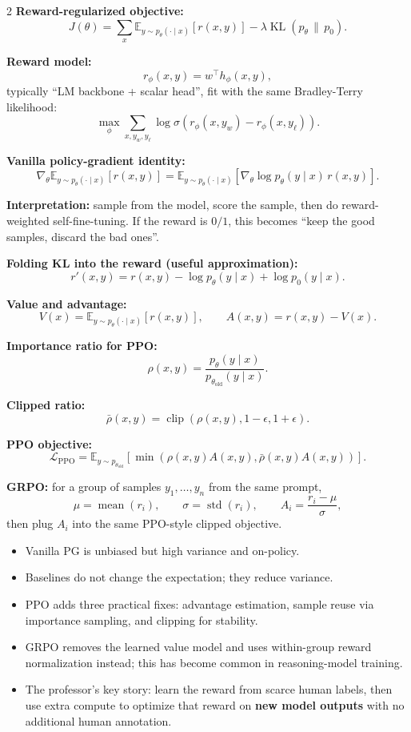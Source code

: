 \documentclass[10pt]{article}
\newcommand{\KL}{\operatorname{KL}}
\newcommand{\clip}{\operatorname{clip}}
\newcommand{\E}{\mathbb{E}}
\begin{document}
\begin{multicols*}{2}
\textbf{Reward-regularized objective:}
\[
J(\theta)
=
\sum_x
\E_{y \sim p_\theta(\cdot \mid x)}
\left[r(x,y)\right]
-\lambda \KL(p_\theta \,\|\, p_0).
\]

\textbf{Reward model:}
\[
r_\phi(x,y)=w^{\top} h_\phi(x,y),
\]
typically ``LM backbone + scalar head'', fit with the same Bradley-Terry likelihood:
\[
\max_\phi
\sum_{x,y_w,y_\ell}
\log \sigma\!\left(r_\phi(x,y_w)-r_\phi(x,y_\ell)\right).
\]

\textbf{Vanilla policy-gradient identity:}
\[
\nabla_\theta
\E_{y \sim p_\theta(\cdot \mid x)}[r(x,y)]
=
\E_{y \sim p_\theta(\cdot \mid x)}
\left[
\nabla_\theta \log p_\theta(y \mid x)\, r(x,y)
\right].
\]

\textbf{Interpretation:} sample from the model, score the sample, then do reward-weighted self-fine-tuning. If the reward is \(0/1\), this becomes ``keep the good samples, discard the bad ones''.

\textbf{Folding KL into the reward (useful approximation):}
\[
r'(x,y)
=
r(x,y)-\log p_\theta(y \mid x)+\log p_0(y \mid x).
\]

\textbf{Value and advantage:}
\[
V(x)=\E_{y \sim p_\theta(\cdot \mid x)}[r(x,y)],
\qquad
A(x,y)=r(x,y)-V(x).
\]

\textbf{Importance ratio for PPO:}
\[
\rho(x,y)=\frac{p_\theta(y \mid x)}{p_{\theta_{\mathrm{old}}}(y \mid x)}.
\]

\textbf{Clipped ratio:}
\[
\bar{\rho}(x,y)=\clip(\rho(x,y),1-\epsilon,1+\epsilon).
\]

\textbf{PPO objective:}
\[
\mathcal{L}_{\mathrm{PPO}}
=
\E_{y \sim p_{\theta_{\mathrm{old}}}}
\left[
\min\!\left(
\rho(x,y)A(x,y),
\bar{\rho}(x,y)A(x,y)
\right)
\right].
\]

\textbf{GRPO:}
for a group of samples \(y_1,\dots,y_n\) from the same prompt,
\[
\mu=\operatorname{mean}(r_i),
\qquad
\sigma=\operatorname{std}(r_i),
\qquad
A_i=\frac{r_i-\mu}{\sigma},
\]
then plug \(A_i\) into the same PPO-style clipped objective.

\begin{itemize}
\item Vanilla PG is unbiased but high variance and on-policy.
\item Baselines do not change the expectation; they reduce variance.
\item PPO adds three practical fixes: advantage estimation, sample reuse via importance sampling, and clipping for stability.
\item GRPO removes the learned value model and uses within-group reward normalization instead; this has become common in reasoning-model training.
\item The professor's key story: learn the reward from scarce human labels, then use extra compute to optimize that reward on \textbf{new model outputs} with no additional human annotation.
\end{itemize}


\end{multicols*}
\end{document}
